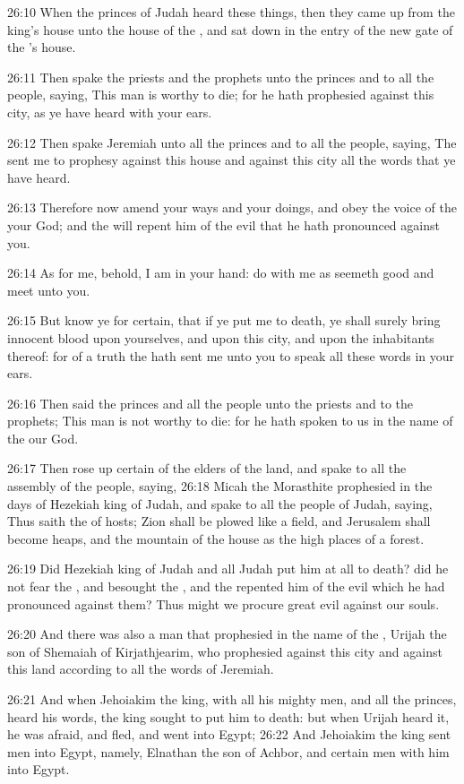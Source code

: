 26:10 When the princes of Judah heard these things, then they came up from the king's house unto the house of the \LORD, and sat down in the entry of the new gate of the \LORD's house.

26:11 Then spake the priests and the prophets unto the princes and to all the people, saying, This man is worthy to die; for he hath prophesied against this city, as ye have heard with your ears.

26:12 Then spake Jeremiah unto all the princes and to all the people, saying, The \LORD sent me to prophesy against this house and against this city all the words that ye have heard.

26:13 Therefore now amend your ways and your doings, and obey the voice of the \LORD your God; and the \LORD will repent him of the evil that he hath pronounced against you.

26:14 As for me, behold, I am in your hand: do with me as seemeth good and meet unto you.

26:15 But know ye for certain, that if ye put me to death, ye shall surely bring innocent blood upon yourselves, and upon this city, and upon the inhabitants thereof: for of a truth the \LORD hath sent me unto you to speak all these words in your ears.

26:16 Then said the princes and all the people unto the priests and to the prophets; This man is not worthy to die: for he hath spoken to us in the name of the \LORD our God.

26:17 Then rose up certain of the elders of the land, and spake to all the assembly of the people, saying, 26:18 Micah the Morasthite prophesied in the days of Hezekiah king of Judah, and spake to all the people of Judah, saying, Thus saith the \LORD of hosts; Zion shall be plowed like a field, and Jerusalem shall become heaps, and the mountain of the house as the high places of a forest.

26:19 Did Hezekiah king of Judah and all Judah put him at all to death?  did he not fear the \LORD, and besought the \LORD, and the \LORD repented him of the evil which he had pronounced against them? Thus might we procure great evil against our souls.

26:20 And there was also a man that prophesied in the name of the \LORD, Urijah the son of Shemaiah of Kirjathjearim, who prophesied against this city and against this land according to all the words of Jeremiah.

26:21 And when Jehoiakim the king, with all his mighty men, and all the princes, heard his words, the king sought to put him to death: but when Urijah heard it, he was afraid, and fled, and went into Egypt; 26:22 And Jehoiakim the king sent men into Egypt, namely, Elnathan the son of Achbor, and certain men with him into Egypt.


